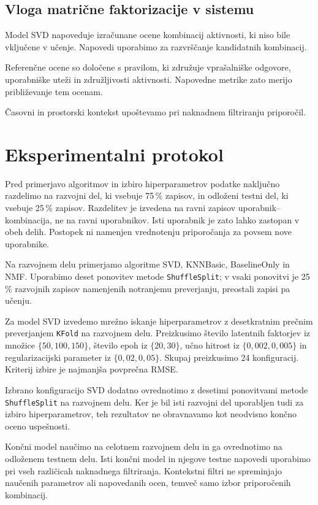\documentclass[a4paper,twoside,openright,12pt,slovene]{book}
\begin{document}
\subsection{Vloga matrične faktorizacije v sistemu}

Model SVD napoveduje izračunane ocene kombinacij aktivnosti,
ki niso bile vključene v učenje. Napovedi uporabimo za
razvrščanje kandidatnih kombinacij.

Referenčne ocene so določene s pravilom, ki združuje
vprašalniške odgovore, uporabniške uteži in združljivosti
aktivnosti. Napovedne metrike zato merijo približevanje
tem ocenam.

Časovni in prostorski kontekst upoštevamo pri naknadnem
filtriranju priporočil.


\section{Eksperimentalni protokol}
\label{sec:experimental_protocol}

Pred primerjavo algoritmov in izbiro hiperparametrov podatke
naključno razdelimo na razvojni del, ki vsebuje 75\,\% zapisov,
in odloženi testni del, ki vsebuje 25\,\% zapisov.
Razdelitev je izvedena na ravni zapisov uporabnik--kombinacija,
ne na ravni uporabnikov. Isti uporabnik je zato lahko zastopan
v obeh delih. Postopek ni namenjen vrednotenju priporočanja
za povsem nove uporabnike.

Na razvojnem delu primerjamo algoritme SVD, KNNBasic,
BaselineOnly in NMF. Uporabimo deset ponovitev metode
\texttt{ShuffleSplit}; v vsaki ponovitvi je 25\,\% razvojnih
zapisov namenjenih notranjemu preverjanju, preostali zapisi
pa učenju.

Za model SVD izvedemo mrežno iskanje hiperparametrov z
desetkratnim prečnim preverjanjem \texttt{KFold} na razvojnem delu.
Preizkusimo število latentnih faktorjev iz množice
$\{50,100,150\}$, število epoh iz $\{20,30\}$,
učno hitrost iz $\{0{,}002,0{,}005\}$ in regularizacijski
parameter iz $\{0{,}02,0{,}05\}$. Skupaj preizkusimo
24 konfiguracij. Kriterij izbire je najmanjša povprečna RMSE.

Izbrano konfiguracijo SVD dodatno ovrednotimo z desetimi
ponovitvami metode \texttt{ShuffleSplit} na razvojnem delu.
Ker je bil isti razvojni del uporabljen tudi za izbiro
hiperparametrov, teh rezultatov ne obravnavamo kot neodvisno
končno oceno uspešnosti.

Končni model naučimo na celotnem razvojnem delu in ga ovrednotimo
na odloženem testnem delu. Isti končni model in njegove testne
napovedi uporabimo pri vseh različicah naknadnega filtriranja.
Kontekstni filtri ne spreminjajo naučenih parametrov ali napovedanih
ocen, temveč samo izbor priporočenih kombinacij.
\end{document}
